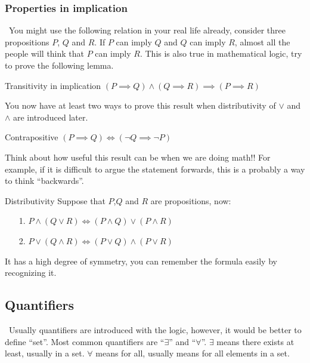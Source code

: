 \documentclass{article}
\begin{document}
\subsubsection{Properties in implication}
\quad\ You might use the following relation in your real life already, consider three propositions $P$, $Q$ and $R$. If
$P$ can imply $Q$ and $Q$ can imply $R$, almost all the people will think that $P$ can imply $R$.
This is also true in mathematical logic, try to prove the following lemma.
\begin{lemma}{Transitivity in implication}
$(P \implies Q) \land (Q \implies R) \implies (P \implies R)$
\end{lemma}
You now have at least two ways to prove this result when distributivity of $\lor$ and $\land$ are introduced later.
\begin{lemma}{Contrapositive}
    $(P \implies Q) \iff (\neg Q \implies \neg P)$
\end{lemma}
Think about how useful this result can be when we are doing math!! For example, if it is difficult to argue the statement
forwards, this is a probably a way to think ``backwards''.
\begin{lemma}{Distributivity}
    Suppose that $P$,$Q$ and $R$ are propositions, now:
    \begin{itemize}
        \item[1.] $P \land (Q \lor R) \iff (P \land Q) \lor (P \land R)$
        \item[2.] $P \lor (Q \land R) \iff (P \lor Q) \land (P \lor R)$
    \end{itemize}

\end{lemma}
It has a high degree of symmetry, you can remember the formula easily by recognizing it.
\subsection{Quantifiers}
\quad\ Usually quantifiers are introduced with the logic, however, it would be better to define ``set''. Most common quantifiers are ``$\exists$'' and ``$\forall$''.
$\exists$ means there exists at least, usually in a set. $\forall$ means for all, usually means for all elements in a set.
\end{document}

